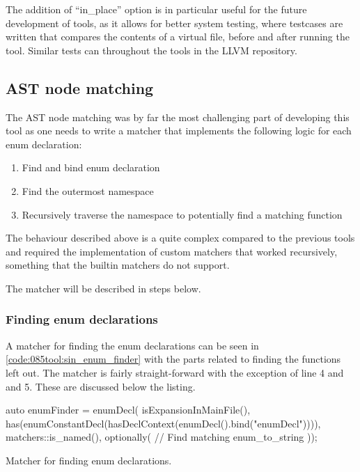 The addition of ``in\_place'' option is in particular useful for the future development of tools, as it allows for better system testing, where testcases are written that compares the contents of a virtual file, before and after running the tool.
Similar tests can throughout the tools in the LLVM repository.

\subsection{AST node matching}\label{subsec:085tool:enum_node_matching_sin}

The AST node matching was by far the most challenging part of developing this tool as one needs to write a matcher that implements the following logic for each enum declaration:

\vspace*{-0.75em}
\begin{enumerate}
    \item Find and bind enum declaration
    \item Find the outermost namespace
    \item Recursively traverse the namespace to potentially find a matching  function
\end{enumerate}

The behaviour described above is a quite complex compared to the previous tools and required the implementation of custom matchers that worked recursively, something that the builtin matchers do not support.

The matcher will be described in steps below.

\subsubsection*{Finding enum declarations}
A matcher for finding the enum declarations can be seen in \cref{code:085tool:sin_enum_finder} with the parts related to finding the  functions left out.
The matcher is fairly straight-forward with the exception of line 4 and and 5. These are discussed below the listing.

\begin{listing}[H]
    \begin{cppcode}
auto enumFinder = enumDecl(
        isExpansionInMainFile(),
        has(enumConstantDecl(hasDeclContext(enumDecl().bind("enumDecl")))),
        matchers::is_named(),
        optionally(
            // Find matching enum_to_string
        ));
    \end{cppcode}
    \caption{Matcher for finding enum declarations.}
    \label{code:085tool:sin_enum_finder}
\end{listing}

